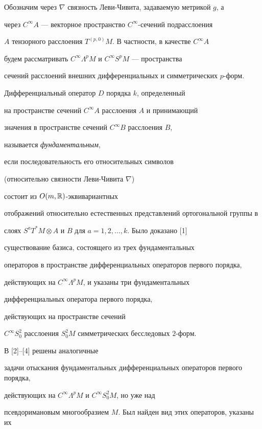 Обозначим через $\nabla$ связность Леви-Чивита, задаваемую метрикой $g$, а


через $C^\infty A$ --- векторное пространство $C^\infty$-сечений подрасслоения


$A$ тензорного расслоения $T^{(p,0)}M$. В частности, в качестве $C^\infty A$ 


будем рассматривать $C^\infty \Lambda ^pM$ и $C^\infty S^pM$ --- пространства 


сечений расслоений внешних дифференциальных и симметрических $p$-форм. 





Дифференциальный оператор $D$ порядка $k$, определенный


на пространстве сечений $C^\infty A$ расслоения $A$ и принимающий


значения в пространстве сечений $C^\infty B$ расслоения $B$,


называется {\it фундаментальным},


если последовательность его относительных символов


(относительно связности Леви-Чивита $\nabla$)


состоит из $O(m,\Bbb R)$-эквивариантных


отображений относительно естественных представлений ортогональной группы в


слоях $S^aT^*M \otimes A$ и $B$ для $a=1,2,\dotsc,k$. Было доказано [1]


существование базиса, состоящего из трех фундаментальных


операторов в пространстве дифференциальных операторов первого порядка,


действующих на $C^\infty \Lambda^pM$, и указаны три фундаментальных


дифференциальных оператора первого порядка,


действующих на пространстве сечений


$C^\infty S^2_0$ расслоения $S^2_0 M$ симметрических бесследовых $2$-форм.





В [2]--[4] решены аналогичные


задачи отыскания фундаментальных дифференциальных операторов первого порядка,


действующих на $C^\infty\Lambda^pM$ и $C^\infty S^2_0M$, но уже над


псевдоримановым многообразием $M$. Был найден вид этих операторов, указаны их


